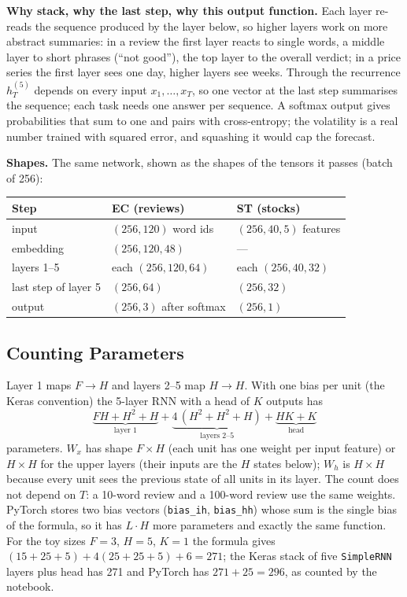 \textbf{Why stack, why the last step, why this output function.} Each layer re-reads the sequence produced by the layer below, so higher layers work on more abstract summaries:
in a review the first layer reacts to single words, a middle layer to short phrases (``not good''), the top layer to the overall verdict; in a price series the first layer sees one day, higher layers see
weeks. Through the recurrence $h^{(5)}_T$ depends on every input $x_1,\dots,x_T$, so one vector at the last step summarises the sequence; each task needs one answer per sequence. A softmax output gives probabilities
that sum to one and pairs with cross-entropy; the volatility is a real number trained with squared error, and squashing it would cap the forecast.

\textbf{Shapes.} The same network, shown as the shapes of the tensors it passes (batch of 256):
\begin{center}
\small
\begin{tabular}{@{}lll@{}}
\toprule
Step & EC (reviews) & ST (stocks) \\
\midrule
input & $(256,120)$ word ids & $(256,40,5)$ features \\
embedding & $(256,120,48)$ & --- \\
layers 1--5 & each $(256,120,64)$ & each $(256,40,32)$ \\
last step of layer 5 & $(256,64)$ & $(256,32)$ \\
output & $(256,3)$ after softmax & $(256,1)$ \\
\bottomrule
\end{tabular}
\end{center}

\subsection{Counting Parameters}

Layer 1 maps $F\to H$ and layers 2--5 map $H\to H$. With one bias per unit (the Keras convention) the 5-layer RNN with a head of $K$ outputs has
\begin{equation}
\underbrace{FH+H^2+H}_{\text{layer 1}}+\underbrace{4\,(H^2+H^2+H)}_{\text{layers 2--5}}+\underbrace{HK+K}_{\text{head}}
\end{equation}
parameters. $W_x$ has shape $F\times H$ (each unit has one weight per input feature) or $H\times H$ for the upper layers (their inputs are the $H$ states below); $W_h$ is $H\times H$ because every unit sees the previous state of all units in its layer.
The count does not depend on $T$: a 10-word review and a 100-word review use the same weights. PyTorch stores two bias vectors (\texttt{bias\_ih}, \texttt{bias\_hh}) whose sum is the single bias of the formula, so it has $L\cdot H$ more
parameters and exactly the same function. For the toy sizes $F=3$, $H=5$, $K=1$ the formula gives $(15+25+5)+4(25+25+5)+6=271$; the Keras stack of five \texttt{SimpleRNN} layers plus head has 271 and PyTorch has $271+25=296$, as counted by the notebook.

